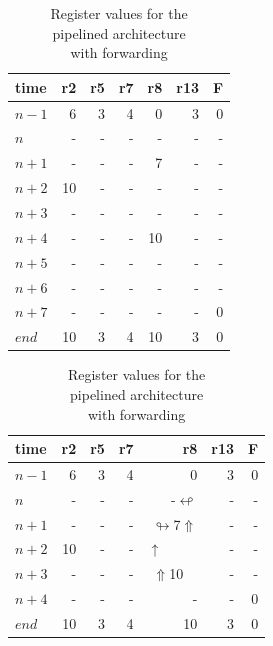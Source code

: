 \begin{table}[htbp]
			\centering

\begin{minipage}[t]{0.45\textwidth}

 \caption[Sample Execution of the pipelined arch. with stalls]{Register values for the \\pipelined architecture\\ waiting for data}
 \label{tab:pipe2}
\centering\begin{tabular}{|l|r|r|r|r|r||r|} \hline
time & r2 & r5 & r7 & r8 & r13 & F \\ \hline
$n-1$ & 6 & 3 & 4 & 0 & 3 & 0 \\ \hline
$n$ & - &-& - &-& - & - \\ \hline
$n+1$ & - &-& - & 7 & - & - \\ \hline
$n+2$ & 10 &-& - &-& - & -\\ \hline
$n+3$ & - &-& -&-& - & -\\ \hline
$n+4$ & - &-& - &10& - & - \\ \hline 
$n+5$ & - &-& - &-& - & - \\ \hline 
$n+6$ & - &-& - &-& - & - \\ \hline 
$n+7$ & - &-& - &-& - & 0 \\ \hline \hline
$end$ & 10 & 3 & 4 & 10 &3&0 \\ \hline


\end{tabular}
\end{minipage}
			\begin{minipage}[t]{0.45\textwidth}

 \caption[Sample Execution of the pipelined arch. with forwarding]{Register values for the \\pipelined architecture\\with forwarding}
 \label{tab:pipe3}
\centering\begin{tabular}{|l|r|r|r|r|r||r|} \hline
time & r2 & r5 & r7 & r8 & r13 & F \\ \hline
$n-1$ & 6 & 3 & 4 & 0 & 3 & 0 \\ \hline
$n$ & - &-& - &-$\looparrowleft$& - & - \\ \hline
$n+1$ & - &-& - & $\looparrowright$7$\Uparrow$ & - & - \\ \hline
$n+2$ & 10 &-& - &$\uparrow$\ \ \ \ \ & - & -\\ \hline
$n+3$ & - &-& -&$\Uparrow$10\ \ & - & -\\ \hline
$n+4$ & - &-& - &-& - & 0 \\ \hline \hline
$end$ & 10 & 3 & 4 & 10 &3&0 \\ \hline

\end{tabular}
\end{minipage}\hfill			

\end{table}
